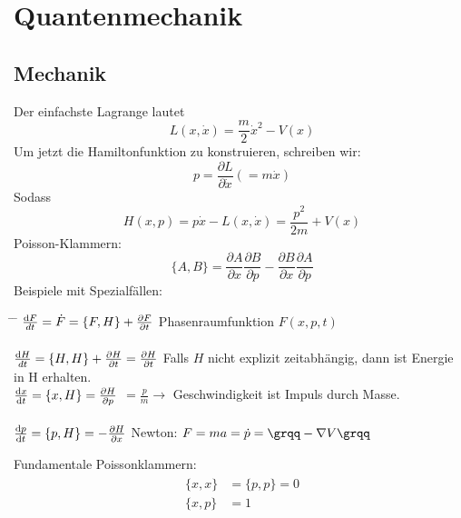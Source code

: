 	
\section{Quantenmechanik}
	\subsection{Mechanik}
		Der einfachste Lagrange lautet 
			\begin{equation*}
				L (x,\dot{x}) = \frac{m}{2} \dot{x}^2 - V(x) 
			\end{equation*}
		Um jetzt die Hamiltonfunktion zu konstruieren, schreiben wir:
			\begin{equation*}
				p=
				\frac{\partial L}{\partial \dot{x}}
				(=m \dot{x})
			\end{equation*}
		Sodass
			\begin{equation*}
				H(x,p)= 
				p \dot{x} - L(x,\dot{x}) = 
				\frac{p^2}{2m} + V(x)
			\end{equation*}
		Poisson-Klammern:
			\begin{equation*}
				\{A,B\}=
				\frac{\partial A}{\partial x} \frac{\partial B}{\partial p}
				- \frac{\partial B}{\partial x} \frac{\partial A}{\partial p}
			\end{equation*}
		Beispiele mit Spezialfällen:
		\begin{tabbing}
			\hspace{0.4\linewidth} \= \hspace{0.6\linewidth} \= \hfill \kill
			$\frac{\mathrm{d} F}{dt} = \dot{F} = \{F,H\} + \frac{\partial F}{\partial t}$ \> 
			Phasenraumfunktion $F(x,p,t)$ \\ \\
			$\frac{\mathrm{d} H}{dt} = \{H,H\} + \frac{\partial H}{\partial t} = \frac{\partial H}{\partial t}$ \>
			Falls $H$ nicht explizit zeitabhängig, dann ist Energie \\
			\hfill \>  in H erhalten. \\  %
			$\frac{\mathrm{d} x}{\mathrm{d} t} = \{x,H\} = \frac{\partial H}{\partial p}$ \>
			$=\frac{p}{m} \rightarrow$ Geschwindigkeit ist Impuls durch Masse. \\ \\
			$\frac{\mathrm{d} p}{\mathrm{d} t} = \{p,H\} = -\frac{\partial H}{\partial x}$ \>
			Newton: $F= ma= \dot{p} = \text{\grqq} - \nabla V \text{\grqq} $	%
		\end{tabbing}
		Fundamentale Poissonklammern:
			\begin{align*}
				\begin{split}
					\{x,x\} &=\{p,p\}= 0 \\
					\{x,p\} &= 1
				\end{split}
			\end{align*}
